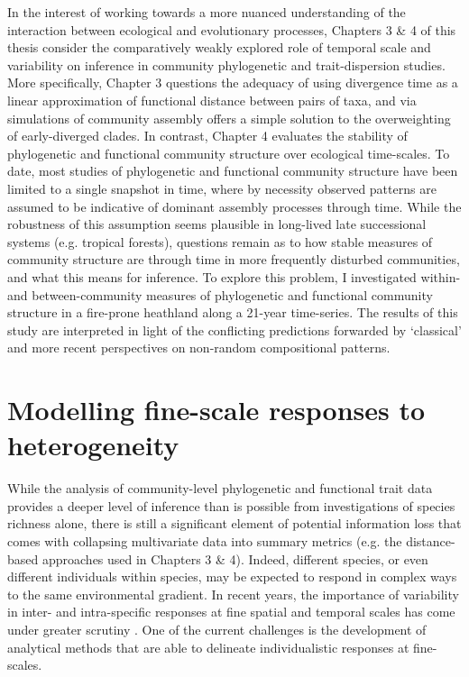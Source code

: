 In the interest of working towards a more nuanced understanding of the interaction between ecological and evolutionary processes, Chapters 3 \& 4 of this thesis consider the comparatively weakly explored role of temporal scale and variability on inference in community phylogenetic and trait-dispersion studies. More specifically, Chapter 3 questions the adequacy of using divergence time as a linear approximation of functional distance between pairs of taxa, and via simulations of community assembly offers a simple solution to the overweighting of early-diverged clades. In contrast, Chapter 4 evaluates the stability of phylogenetic and functional community structure over ecological time-scales. To date, most studies of phylogenetic and functional community structure have been limited to a single snapshot in time, where by necessity observed patterns are assumed to be indicative of dominant assembly processes through time. While the robustness of this assumption seems plausible in long-lived late successional systems (e.g. tropical forests), questions remain as to how stable measures of community structure are through time in more frequently disturbed communities, and what this means for inference. To explore this problem, I investigated within- and between-community measures of phylogenetic and functional community structure in a fire-prone heathland along a 21-year time-series. The results of this study are interpreted in light of the conflicting predictions forwarded by `classical' and more recent perspectives on non-random compositional patterns.    

\section{Modelling fine-scale responses to heterogeneity}

While the analysis of community-level phylogenetic and functional trait data provides a deeper level of inference than is possible from investigations of species richness alone, there is still a significant element of potential information loss that comes with collapsing multivariate data into summary metrics (e.g. the distance-based approaches used in Chapters 3 \& 4). Indeed, different species, or even different individuals within species, may be expected to respond in complex ways to the same environmental gradient. In recent years,  the importance of variability in inter- and intra-specific responses at fine spatial and temporal scales has come under greater scrutiny \citep[e.g.][]{Sears2007, Fridley2011, Dwyer2015, Lai2015}. One of the current challenges is the development of analytical methods that are able to delineate individualistic responses at fine-scales.

